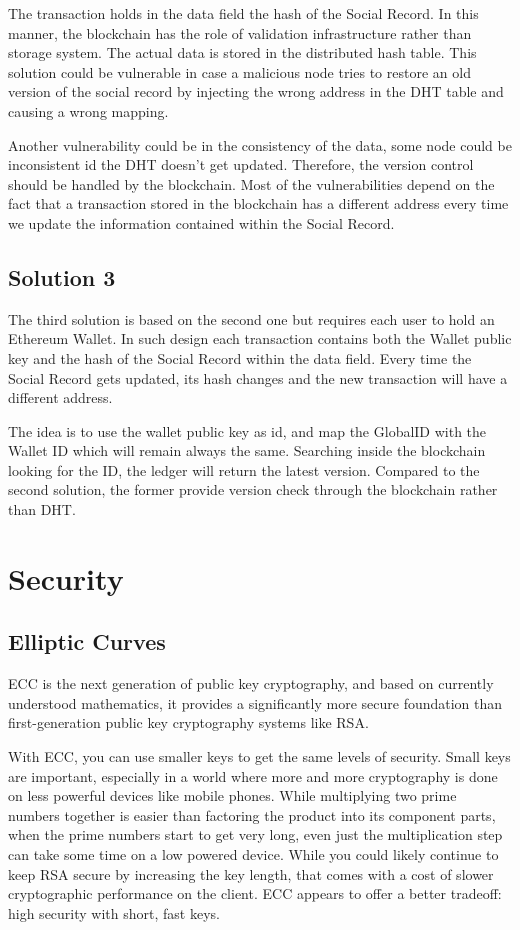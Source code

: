 The transaction holds in the data field the hash of the Social Record. In this manner, the blockchain has the role of validation infrastructure rather than storage system. The actual data is stored in the distributed hash table. This solution could be vulnerable in case a malicious node tries to restore an old version of the social record by injecting the wrong address in the DHT table and causing a wrong mapping. 

Another vulnerability could be in the consistency of the data, some node could be inconsistent id the DHT doesn’t get updated. Therefore, the version control should be handled by the blockchain. Most of the vulnerabilities depend on the fact that a transaction stored in the blockchain has a different address every time we update the information contained within the Social Record. 

\subsection{Solution 3}
The third solution is based on the second one but requires each user to hold an Ethereum Wallet. In such design each transaction contains both the Wallet public key and the hash of the Social Record within the data field. Every time the Social Record gets updated, its hash changes and the new transaction will have a different address. 

The idea is to use the wallet public key as id, and map the GlobalID with the Wallet ID which will remain always the same. Searching inside the blockchain looking for the ID, the ledger will return the latest version. Compared to the second solution, the former provide version check through the blockchain rather than DHT. 

\section{Security}
\subsection{Elliptic Curves}
ECC is the next generation of public key cryptography, and based on currently understood mathematics, it provides a significantly more secure foundation than first-generation public key cryptography systems like RSA. 

With ECC, you can use smaller keys to get the same levels of security. Small keys are important, especially in a world where more and more cryptography is done on less powerful devices like mobile phones. While multiplying two prime numbers together is easier than factoring the product into its component parts, when the prime numbers start to get very long, even just the multiplication step can take some time on a low powered device. While you could likely continue to keep RSA secure by increasing the key length, that comes with a cost of slower cryptographic performance on the client. ECC appears to offer a better tradeoff: high security with short, fast keys.